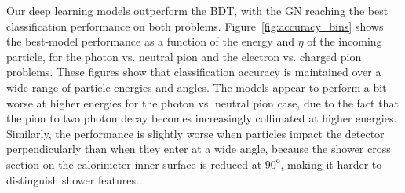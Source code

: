 Our deep learning models outperform the BDT, with the GN reaching the best classification performance on both problems. Figure~\ref{fig:accuracy_bins} shows the best-model performance as a function of the energy and $\eta$ of the incoming particle, for the photon vs. neutral pion and the electron vs. charged pion problems. These figures show that classification accuracy is maintained over a wide range of particle energies and angles. The models appear to perform a bit worse at higher energies for the photon vs. neutral pion case, due to the fact that the pion to two photon decay becomes increasingly collimated at higher energies. Similarly, the performance is slightly worse when particles impact the detector perpendicularly than when they enter at a wide angle, because the shower cross section on the calorimeter inner surface is reduced at $90^{\mathrm o}$, making it harder to distinguish shower features.

